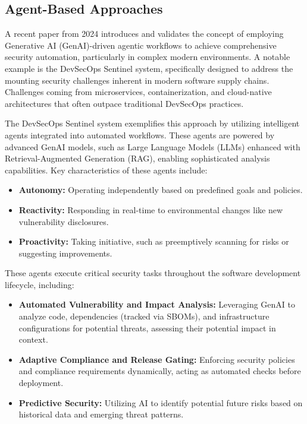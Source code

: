 
\subsection{Agent-Based Approaches} %
\label{sec:Agent-Based Approaches}

A recent paper from 2024 introduces and validates the concept of employing Generative AI (GenAI)-driven agentic workflows to achieve comprehensive security automation, particularly in complex modern environments. A notable example is the DevSecOps Sentinel system\cite{pillala_devsecops_2024}, specifically designed to address the mounting security challenges inherent in modern software supply chains. Challenges coming from microservices, containerization, and cloud-native architectures that often outpace traditional DevSecOps practices\cite{pillala_devsecops_2024}.

The DevSecOps Sentinel system exemplifies this approach by utilizing intelligent agents integrated into automated workflows. These agents are powered by advanced GenAI models, such as Large Language Models (LLMs) enhanced with Retrieval-Augmented Generation (RAG), enabling sophisticated analysis capabilities\cite{pillala_devsecops_2024}. Key characteristics of these agents include:

\begin{itemize}
    \item \textbf{Autonomy:} Operating independently based on predefined goals and policies.
    \item \textbf{Reactivity:} Responding in real-time to environmental changes like new vulnerability disclosures.
    \item \textbf{Proactivity:} Taking initiative, such as preemptively scanning for risks or suggesting improvements\cite{pillala_devsecops_2024}.
\end{itemize}

These agents execute critical security tasks throughout the software development lifecycle, including:

\begin{itemize}
    \item \textbf{Automated Vulnerability and Impact Analysis:} Leveraging GenAI to analyze code, dependencies (tracked via SBOMs), and infrastructure configurations for potential threats, assessing their potential impact in context\cite{pillala_devsecops_2024}.
    \item \textbf{Adaptive Compliance and Release Gating:} Enforcing security policies and compliance requirements dynamically, acting as automated checks before deployment\cite{pillala_devsecops_2024}.
    \item \textbf{Predictive Security:} Utilizing AI to identify potential future risks based on historical data and emerging threat patterns\cite{pillala_devsecops_2024}.
\end{itemize}


